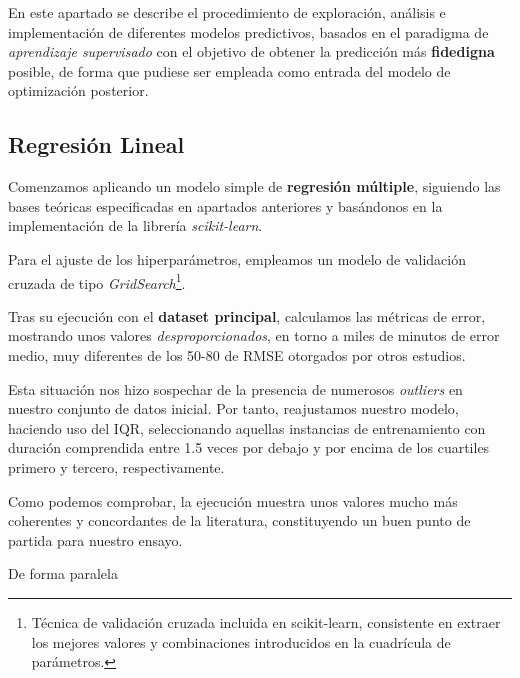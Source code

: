 En este apartado se describe el procedimiento de exploración, análisis e implementación de diferentes modelos predictivos, basados en el paradigma de \textit{aprendizaje supervisado} con el objetivo de obtener la predicción más \textbf{fidedigna} posible, de forma que pudiese ser empleada como entrada del modelo de optimización posterior.


\subsection{Regresión Lineal}

Comenzamos aplicando un modelo simple de \textbf{regresión múltiple}, siguiendo las bases teóricas especificadas en apartados anteriores y basándonos en la implementación de la librería \textit{scikit-learn}\cite{2021Scikit-LearnPython}.

Para el ajuste de los hiperparámetros, empleamos un modelo de validación cruzada de tipo \textit{GridSearch}\footnote{Técnica de validación cruzada incluida en scikit-learn, consistente en extraer los mejores valores y combinaciones introducidos en la cuadrícula de parámetros.}.

Tras su ejecución con el \textbf{dataset principal}, calculamos las métricas de error, mostrando unos valores \textit{desproporcionados}, en torno a miles de minutos de error medio, muy diferentes de los 50-80 de RMSE otorgados por otros estudios\cite{ShahabiKargar2014PredictingSurgery}.


Esta situación nos hizo sospechar de la presencia de numerosos \textit{outliers} en nuestro conjunto de datos inicial. Por tanto, reajustamos nuestro modelo, haciendo uso del IQR\cite{Bonthu2021DetectingOutliers}, seleccionando aquellas instancias de entrenamiento con duración comprendida entre 1.5 veces por debajo y por encima de los cuartiles primero y tercero, respectivamente.


Como podemos comprobar, la ejecución muestra unos valores mucho más coherentes y concordantes de la literatura, constituyendo un buen punto de partida para nuestro ensayo.

\imagen{}{}{}

De forma paralela


 